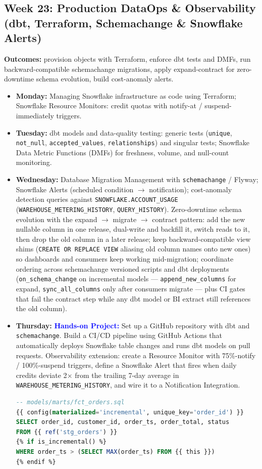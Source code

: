 \documentclass[11pt, a4paper]{article}
\newcommand{\project}[1]{\textbf{\textcolor{blue}{Hands-on Project:}} #1}
\newcommand{\dayitem}[2]{\item \textbf{#1:} #2}
\begin{document}
\subsection*{Week 23: Production DataOps \& Observability (dbt, Terraform, Schemachange \& Snowflake Alerts)}
\par\noindent\textbf{Outcomes:} provision objects with Terraform, enforce dbt tests and DMFs, run backward-compatible schemachange migrations, apply expand-contract for zero-downtime schema evolution, build cost-anomaly alerts.
\begin{itemize}[label=-]
    \dayitem{Monday}{Managing Snowflake infrastructure as code using Terraform; Snowflake Resource Monitors: credit quotas with notify-at / suspend-immediately triggers.}
    \dayitem{Tuesday}{dbt models and data-quality testing: generic tests (\texttt{unique}, \texttt{not\_null}, \texttt{accepted\_values}, \texttt{relationships}) and singular tests; Snowflake Data Metric Functions (DMFs) for freshness, volume, and null-count monitoring.}
    \dayitem{Wednesday}{Database Migration Management with \texttt{schemachange} / Flyway; Snowflake Alerts (scheduled condition $\rightarrow$ notification); cost-anomaly detection queries against \texttt{SNOWFLAKE.ACCOUNT\_USAGE} (\texttt{WAREHOUSE\_METERING\_HISTORY}, \texttt{QUERY\_HISTORY}). Zero-downtime schema evolution with the expand $\rightarrow$ migrate $\rightarrow$ contract pattern: add the new nullable column in one release, dual-write and backfill it, switch reads to it, then drop the old column in a later release; keep backward-compatible view shims (\texttt{CREATE OR REPLACE VIEW} aliasing old column names onto new ones) so dashboards and consumers keep working mid-migration; coordinate ordering across schemachange versioned scripts and dbt deployments (\texttt{on\_schema\_change} on incremental models --- \texttt{append\_new\_columns} for expand, \texttt{sync\_all\_columns} only after consumers migrate --- plus CI gates that fail the contract step while any dbt model or BI extract still references the old column).}
    \dayitem{Thursday}{\project{Set up a GitHub repository with dbt and \texttt{schemachange}. Build a CI/CD pipeline using GitHub Actions that automatically deploys Snowflake table changes and runs dbt models on pull requests. Observability extension: create a Resource Monitor with 75\%-notify / 100\%-suspend triggers, define a Snowflake Alert that fires when daily credits deviate 2$\times$ from the trailing 7-day average in \texttt{WAREHOUSE\_METERING\_HISTORY}, and wire it to a Notification Integration.}}
\begin{lstlisting}[language=SQL, caption={dbt model + schema.yml tests block}]
-- models/marts/fct_orders.sql
{{ config(materialized='incremental', unique_key='order_id') }}
SELECT order_id, customer_id, order_ts, order_total, status
FROM {{ ref('stg_orders') }}
{% if is_incremental() %}
WHERE order_ts > (SELECT MAX(order_ts) FROM {{ this }})
{% endif %}


\end{lstlisting}
\end{itemize}
\end{document}

